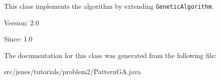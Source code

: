 This class implements the algorithm by extending {\tt GeneticAlgorithm}.

\begin{Desc}
\item[Version:]2.0 \end{Desc}
\begin{Desc}
\item[Since:]1.0 \end{Desc}


The documentation for this class was generated from the following file:\begin{CompactItemize}
\item 
src/jenes/tutorials/problem2/PatternGA.java\end{CompactItemize}
